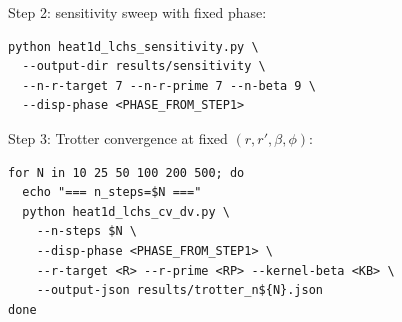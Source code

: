 \documentclass[11pt]{article}
\begin{document}
Step 2: sensitivity sweep with fixed phase:
\begin{verbatim}
python heat1d_lchs_sensitivity.py \
  --output-dir results/sensitivity \
  --n-r-target 7 --n-r-prime 7 --n-beta 9 \
  --disp-phase <PHASE_FROM_STEP1>
\end{verbatim}

Step 3: Trotter convergence at fixed $(r,r',\beta,\phi)$:
\begin{verbatim}
for N in 10 25 50 100 200 500; do
  echo "=== n_steps=$N ==="
  python heat1d_lchs_cv_dv.py \
    --n-steps $N \
    --disp-phase <PHASE_FROM_STEP1> \
    --r-target <R> --r-prime <RP> --kernel-beta <KB> \
    --output-json results/trotter_n${N}.json
done
\end{verbatim}
\end{document}
